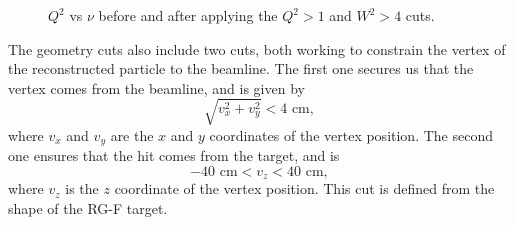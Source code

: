     \begin{figure}[b!]
        \centering{}
        \caption[$Q^2$ vs $\nu$ comparison]{$Q^2$ vs $\nu$ before and after applying the $Q^2 > 1$ and $W^2 > 4$ cuts.}
        \label{fig::q2vsnu}
    \end{figure}

    The geometry cuts also include two cuts, both working to constrain the vertex of the reconstructed particle to the beamline.
    The first one secures us that the vertex comes from the beamline, and is given by
    \begin{equation*}
        \sqrt{v_x^2 + v_y^2} < 4 \text{ cm},
    \end{equation*}
    where $v_x$ and $v_y$ are the $x$ and $y$ coordinates of the vertex position.
    The second one ensures that the hit comes from the target, and is
    \begin{equation*}
        -40 \text{ cm} < v_z < 40 \text{ cm},
    \end{equation*}
    where $v_z$ is the $z$ coordinate of the vertex position.
    This cut is defined from the shape of the RG-F target.

